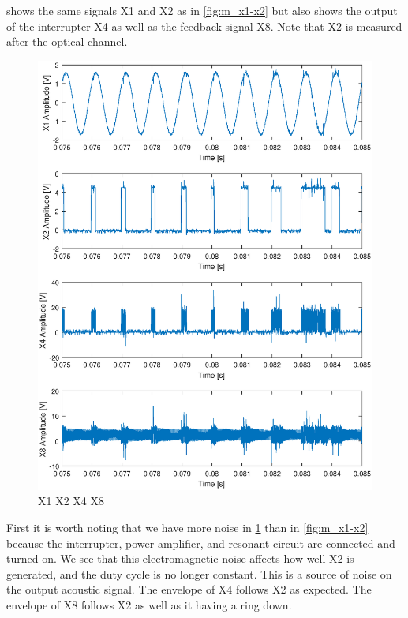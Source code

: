  shows the same signals X1 and X2 as in \cref{fig:m_x1-x2} but also shows the output of the interrupter X4 as well as the feedback signal X8. Note that X2 is measured after the optical channel.

\begin{figure}[H]
    \centering
    \includegraphics[trim={1cm 0cm 1cm 0cm},clip,width=\textwidth]{img/X1-X2-X4-X8.eps}
    \caption{X1 X2 X4 X8}
    \label{fig:m_x1-x2-x4-x8}
\end{figure}

First it is worth noting that we have more noise in \cref{fig:m_x1-x2-x4-x8} than in \cref{fig:m_x1-x2} because the interrupter, power amplifier, and resonant circuit are connected and turned on. We see that this electromagnetic noise affects how well X2 is generated, and the duty cycle is no longer constant. This is a source of noise on the output acoustic signal. The envelope of X4 follows X2 as expected. The envelope of X8 follows X2 as well as it having a ring down.

